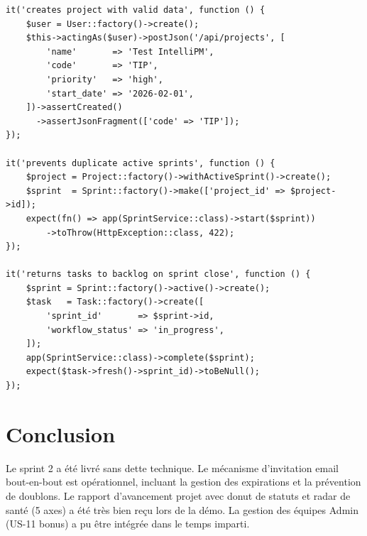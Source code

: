 \begin{lstlisting}[style=phpstyle,caption={Tests unitaires — Projets et sprints (PestPHP)},label={lst:tests_s2}]
it('creates project with valid data', function () {
    $user = User::factory()->create();
    $this->actingAs($user)->postJson('/api/projects', [
        'name'       => 'Test IntelliPM',
        'code'       => 'TIP',
        'priority'   => 'high',
        'start_date' => '2026-02-01',
    ])->assertCreated()
      ->assertJsonFragment(['code' => 'TIP']);
});

it('prevents duplicate active sprints', function () {
    $project = Project::factory()->withActiveSprint()->create();
    $sprint  = Sprint::factory()->make(['project_id' => $project->id]);
    expect(fn() => app(SprintService::class)->start($sprint))
        ->toThrow(HttpException::class, 422);
});

it('returns tasks to backlog on sprint close', function () {
    $sprint = Sprint::factory()->active()->create();
    $task   = Task::factory()->create([
        'sprint_id'       => $sprint->id,
        'workflow_status' => 'in_progress',
    ]);
    app(SprintService::class)->complete($sprint);
    expect($task->fresh()->sprint_id)->toBeNull();
});
\end{lstlisting}

\section*{Conclusion}
Le sprint 2 a été livré sans dette technique. Le mécanisme d'invitation email
bout-en-bout est opérationnel, incluant la gestion des expirations et la
prévention de doublons. Le rapport d'avancement projet avec donut de statuts
et radar de santé (5 axes) a été très bien reçu lors de la démo. La gestion
des équipes Admin (US-11 bonus) a pu être intégrée dans le temps imparti.
